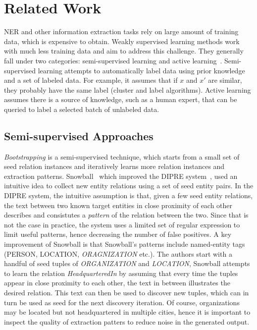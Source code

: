 \section{Related Work}
\label{sect:apner_related}
NER and other information extraction tasks rely on large amount of training data, which is expensive to obtain.
Weakly supervised learning methods work with much less training data and aim to address this challenge.
They generally fall under two categories: semi-supervised learning and active learning~\cite{zhou2017brief}.
Semi-supervised learning attempts to automatically label data using prior knowledge and a set of labeled data. 
For example, it assumes that if $x$ and $x\prime$ are similar, they probably have the same label (cluster and label algorithms).
Active learning assumes there is a source of knowledge, such as a human expert, that can be queried 
to label a selected batch of unlabeled data. 

\subsection{Semi-supervised Approaches}
\textit{Bootstrapping} is a semi-supervised technique, which starts from a small set of seed relation instances and iteratively learns more relation instances and extraction patterns.
Snowball~\cite{agichtein2000snowball} which improved the DIPRE system~\cite{brin1998extracting}, used an intuitive idea to collect new entity relations using a set of seed entity pairs.
In the DIPRE system, the intuitive assumption is that, given a few seed entity relations, the text between two known target entities in close proximity of each other describes and consistutes a \textit{pattern} of the relation between the two. 
Since that is not the case in practice, the system uses a limited set of regular expression to limit useful patterns, hence decreasing the number of false positives.
A key improvement of Snowball
is that Snowball's patterns include named-entity tags ({PERSON}, {LOCATION}, \textit{ORAGNIZATION} etc.).
The authors start with a handful of seed tuples of \textit{ORGANIZATION} and \textit{LOCATION}, Snowball attempts to learn the relation \textit{HeadquarteredIn} by assuming that every time the tuples appear in close proximity to each other, the text in between illustrates the desired relation.
This text can then be used to discover new tuples, which can in turn be used as seed for the next discovery iteration.
Of course, organizations may be located but not headquartered in multiple cities, hence it is important to inspect the quality of extraction patters to reduce noise in the generated output.

